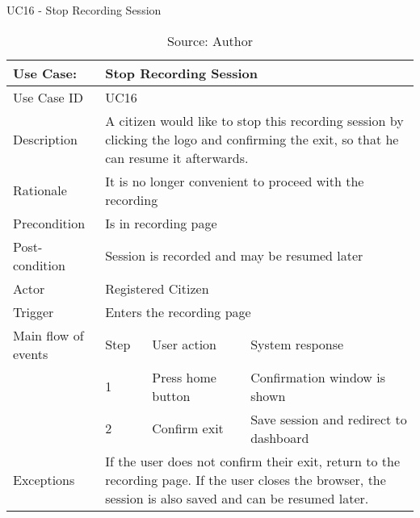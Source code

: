 \begin{table}[h]
\centering
\caption{UC16 - Stop Recording Session}
\label{uc:16}
\begin{tabular}{|p{3cm}|p{1cm}|p{5cm}|p{5cm}|}
\hline
Use Case:       & \multicolumn{3}{p{11cm}|}{Stop Recording Session} \\ \hline
Use Case ID     & \multicolumn{3}{p{11cm}|}{UC16} \\ \hline
Description     & \multicolumn{3}{p{11cm}|}{A citizen would like to stop this recording session by clicking the logo and confirming the exit, so that he can resume it afterwards.} \\ \hline
Rationale       & \multicolumn{3}{p{11cm}|}{It is no longer convenient to proceed with the recording} \\ \hline
Precondition    & \multicolumn{3}{p{11cm}|}{Is in recording page} \\ \hline
Post-condition  & \multicolumn{3}{p{11cm}|}{Session is recorded and may be resumed later} \\ \hline
Actor           & \multicolumn{3}{p{11cm}|}{Registered Citizen} \\ \hline
Trigger         & \multicolumn{3}{p{11cm}|}{Enters the recording page} \\ \hline
Main flow of events & Step  & User action & System response \\ \hline
                    & 1     & Press home button & Confirmation window is shown \\ \hline
                    & 2     & Confirm exit & Save session and redirect to dashboard \\ \hline
Exceptions      & \multicolumn{3}{p{11cm}|}{If the user does not confirm their exit, return to the recording page. If the user closes the browser, the session is also saved and can be resumed later.} \\ \hline
\end{tabular}
\caption*{Source: Author}
\end{table}

